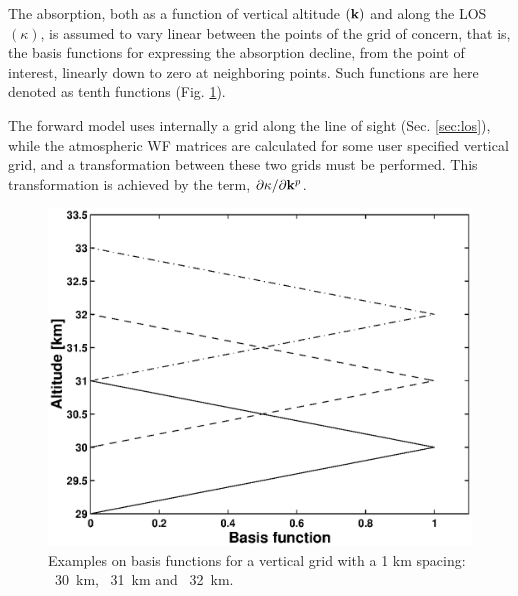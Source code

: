  \label{sec:wfuns:bases}

 The absorption, both as a function of vertical altitude $(\mathbf{k})$
 and along the LOS $(\kappa)$, is assumed to vary linear between the
 points of the grid of concern, that is, the basis functions for
 expressing the absorption decline, from the point of interest,
 linearly down to zero at neighboring points. Such functions are here
 denoted as tenth functions
 (Fig.  \ref{fig:wfuns:zbasis}).
 

 The forward model uses internally a grid along the line of sight
 (Sec. \ref{sec:los}), while the atmospheric WF matrices are
 calculated for some user specified vertical grid, and a
 transformation between these two grids must be performed. This 
 transformation is achieved by the term,
 $\partial\kappa/ \partial \mathbf{k}^p$.

 \begin{figure}[t]
  \begin{center}
   \includegraphics*[width=0.7\hsize]{Figs/fig_absbasis_z.eps}
   \caption{Examples on basis functions for a vertical grid with a 1 km
            spacing: \lsolid~30~km, \ldashed~31~km and \ldashdot~32~km.}
   \label{fig:wfuns:zbasis}  
  \end{center}
 \end{figure}

